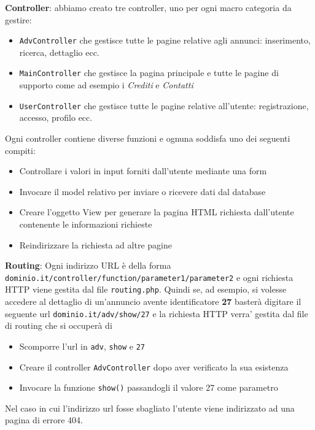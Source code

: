   \par \textbf{Controller}: abbiamo creato tre controller, uno per ogni macro categoria da gestire:
    \begin{itemize}
      \item \texttt{AdvController} che gestisce tutte le pagine relative agli annunci: inserimento, ricerca, dettaglio ecc.
      \item \texttt{MainController} che gestisce la pagina principale e tutte le pagine di supporto come ad esempio i \textit{Crediti} e \textit{Contatti}
      \item \texttt{UserController} che gestisce tutte le pagine relative all'utente: registrazione, accesso, profilo ecc.
    \end{itemize}
    Ogni controller contiene diverse funzioni e ognuna soddisfa uno dei seguenti compiti:
    \begin{itemize}
      \item Controllare i valori in input forniti dall'utente mediante una form
      \item Invocare il model relativo per inviare o ricevere dati dal database
      \item Creare l'oggetto View per generare la pagina HTML richiesta dall'utente contenente le informazioni richieste
      \item Reindirizzare la richiesta ad altre pagine 
    \end{itemize}

  \par \textbf{Routing}: Ogni indirizzo URL \`e della forma \texttt{dominio.it/controller/function/parameter1/parameter2} e ogni richiesta HTTP viene gestita dal file \texttt{routing.php}. Quindi se, ad esempio, si volesse accedere al dettaglio di un'annuncio avente identificatore \textbf{27} baster\`a digitare il seguente url \texttt{dominio.it/adv/show/27} e la richiesta HTTP verra' gestita dal file di routing che si occuper\`a di
     \begin{itemize}
       \item Scomporre l'url in \texttt{adv}, \texttt{show} e \texttt{27}
       \item Creare il controller \texttt{AdvController} dopo aver verificato la sua esistenza
       \item Invocare la funzione \texttt{show()} passandogli il valore 27 come parametro 
    \end{itemize}
    Nel caso in cui l'indirizzo url fosse sbagliato l'utente viene indirizzato ad una pagina di errore 404.

